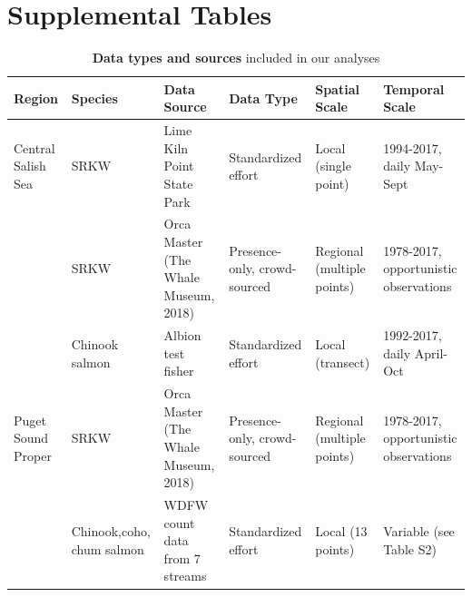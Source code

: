 \documentclass{article}
\begin{document}
\section* {Supplemental Tables}
\begin{table}[ht]
\centering
\caption{\textbf{Data types and sources} included in our analyses} 
\label{tab:salmon}
\begingroup\footnotesize
\begin{tabular}{|p{}|p{}|p{}|p{}|p{}|p{}|}
  \hline
Region & Species & Data Source & Data Type & Spatial Scale & Temporal Scale \\ 
  \hline
Central Salish Sea & SRKW & Lime Kiln Point State Park & Standardized effort & Local (single point) & 1994-2017, daily May-Sept \\ 
   & SRKW & Orca Master (The Whale Museum, 2018) & Presence-only, crowd-sourced & Regional (multiple points) & 1978-2017, opportunistic observations \\ 
   & Chinook salmon & Albion test fisher & Standardized effort & Local (transect) & 1992-2017, daily April-Oct \\ 
   \hline
Puget Sound Proper & SRKW & Orca Master (The Whale Museum, 2018) & Presence-only, crowd-sourced & Regional (multiple points) & 1978-2017, opportunistic observations \\ 
   & Chinook,coho, chum salmon & WDFW count data from 7 streams & Standardized effort & Local (13 points) & Variable (see Table S2) \\ 
   \hline
\end{tabular}
\endgroup
\end{table}
\end{document}
